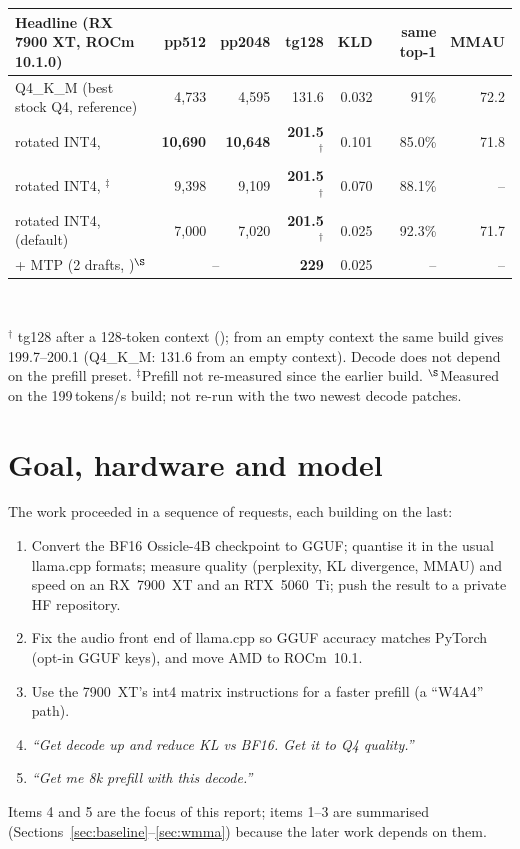 \documentclass[10pt,a4paper]{article}
\newcommand{\tx}[1]{\texttt{\detokenize{#1}}}
\begin{document}
\vspace{4pt}
\begin{center}
\small
\begin{tabular}{@{}lrrrrrr@{}}
\toprule
\textbf{Headline (RX 7900 XT, ROCm 10.1.0)} & pp512 & pp2048 & tg128 & KLD & same top-1 & MMAU\\
\midrule
Q4\_K\_M (best stock Q4, reference) & 4{,}733 & 4{,}595 & 131.6 & 0.032 & 91\% & 72.2\\
rotated INT4, \tx{fast} & \textbf{10{,}690} & \textbf{10{,}648} & \textbf{201.5}$^{\dagger}$ & 0.101 & 85.0\% & 71.8\\
rotated INT4, \tx{balanced}$^{\ddagger}$ & 9{,}398 & 9{,}109 & \textbf{201.5}$^{\dagger}$ & 0.070 & 88.1\% & --\\
rotated INT4, \tx{quality} (default) & 7{,}000 & 7{,}020 & \textbf{201.5}$^{\dagger}$ & 0.025 & 92.3\% & 71.7\\
\midrule
\tx{quality} + MTP (2 drafts, \tx{llama-server})$^{\S}$ & \multicolumn{2}{c}{--} & \textbf{229} & 0.025 & -- & --\\
\bottomrule
\end{tabular}\\[3pt]
\parbox{.92\linewidth}{\scriptsize $^{\dagger}$\tx{llama-bench} tg128 after a 128-token context (\tx{-d 128}); from an empty context the same build gives 199.7--200.1 (Q4\_K\_M: 131.6
from an empty context). Decode does not depend on the prefill preset. $^{\ddagger}$Prefill not re-measured since the earlier build. $^{\S}$Measured on the 199\,tokens/s build;
not re-run with the two newest decode patches.}
\end{center}

\tableofcontents
\newpage

\section{Goal, hardware and model}
\label{sec:goal}

The work proceeded in a sequence of requests, each building on the last:
\begin{enumerate}
\item Convert the BF16 Ossicle-4B checkpoint to GGUF; quantise it in the usual llama.cpp formats; measure quality (perplexity,
      KL divergence, MMAU) and speed on an RX~7900~XT and an RTX~5060~Ti; push the result to a private HF repository.
\item Fix the audio front end of llama.cpp so GGUF accuracy matches PyTorch (opt-in GGUF keys), and move AMD to ROCm~10.1.
\item Use the 7900~XT's int4 matrix instructions for a faster prefill (a ``W4A4'' path).
\item \emph{``Get decode up and reduce KL vs BF16. Get it to Q4 quality.''}
\item \emph{``Get me 8k prefill with this decode.''}
\end{enumerate}
Items 4 and 5 are the focus of this report; items 1--3 are summarised (Sections~\ref{sec:baseline}--\ref{sec:wmma}) because
the later work depends on them.
\end{document}
